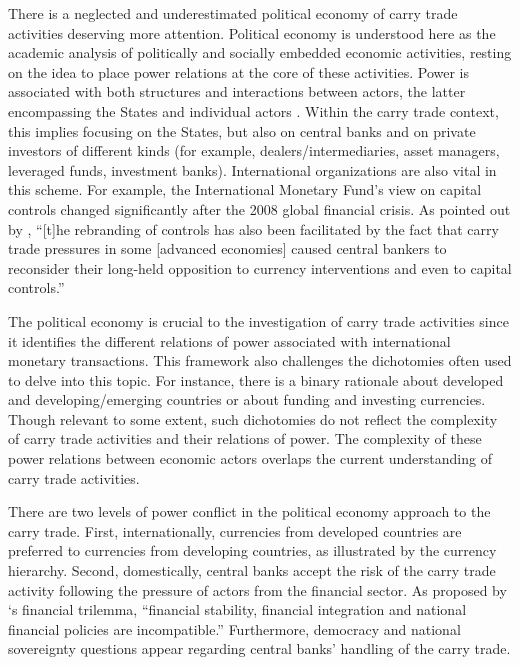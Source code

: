 \documentclass[a4paper, twoside]{templates/ociamthesis}
\begin{document}
There is a neglected and underestimated political economy of carry trade activities deserving more attention. Political economy is understood here as the academic analysis of politically and socially embedded economic activities, resting on the idea to place power relations at the core of these activities. Power is associated with both structures and interactions between actors, the latter encompassing the States and individual actors \autocite{strange1994,may1996}. Within the carry trade context, this implies focusing on the States, but also on central banks and on private investors of different kinds (for example, dealers/intermediaries, asset managers, leveraged funds, investment banks). International organizations are also vital in this scheme. For example, the International Monetary Fund's view on capital controls changed significantly after the 2008 global financial crisis. As pointed out by \textcite[ 213]{grabel2018}, ``{[}t{]}he rebranding of controls has also been facilitated by the fact that carry trade pressures in some {[}advanced economies{]} caused central bankers to reconsider their long-held opposition to currency interventions and even to capital controls.''

The political economy is crucial to the investigation of carry trade activities since it identifies the different relations of power associated with international monetary transactions. This framework also challenges the dichotomies often used to delve into this topic. For instance, there is a binary rationale about developed and developing/emerging countries or about funding and investing currencies. Though relevant to some extent, such dichotomies do not reflect the complexity of carry trade activities and their relations of power. The complexity of these power relations between economic actors overlaps the current understanding of carry trade activities.

There are two levels of power conflict in the political economy approach to the carry trade. First, internationally, currencies from developed countries are preferred to currencies from developing countries, as illustrated by the currency hierarchy. Second, domestically, central banks accept the risk of the carry trade activity following the pressure of actors from the financial sector. As proposed by \textcite[ 57]{schoenmaker2011}`s financial trilemma, ``financial stability, financial integration and national financial policies are incompatible.'' Furthermore, democracy and national sovereignty questions appear regarding central banks' handling of the carry trade.
\end{document}
